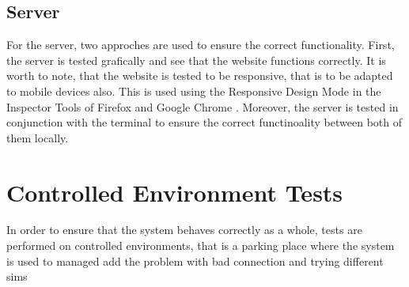 \subsection{Server}

For the server, two approches are used to ensure the correct functionality. First, the server is tested grafically and see that the website functions correctly. It is worth to note, that the website is tested to be responsive, that is to be adapted to mobile devices also. This is used using the Responsive Design Mode in the Inspector Tools of Firefox and Google Chrome . Moreover, the server is tested in conjunction with the terminal to ensure the correct functinoality between both of them locally.

\section{Controlled Environment Tests}

In order to ensure that the system behaves correctly as a whole, tests are performed on controlled environments, that is a parking place where the system is used to managed
add the problem with bad connection and trying different sims
